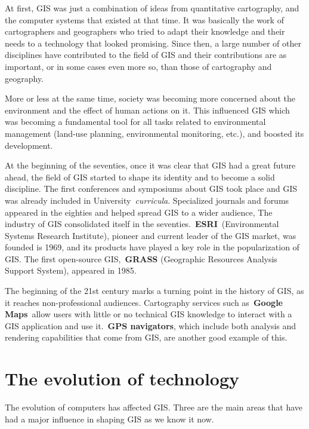 At first, GIS was just a combination of ideas from quantitative cartography, and the computer systems that existed at that time. It was basically the work of cartographers and geographers who tried to adapt their knowledge and their needs to a technology that looked promising. Since then, a large number of other disciplines have contributed to the field of GIS and their contributions are as important, or in some cases even more so, than those of cartography and geography.

More or less at the same time, society was becoming more concerned about the environment and the effect of human actions on it. This influenced GIS which was becoming a fundamental tool for all tasks related to environmental management (land-use planning, environmental monitoring, etc.), and boosted its development.

At the beginning of the seventies, once it was clear that GIS had a great future ahead, the field of GIS started to shape its identity and to become a solid discipline. The first conferences and symposiums about GIS took place and GIS was already included in University \emph{curricula}. Specialized journals and forums appeared in the eighties and helped spread GIS to a wider audience, 
The industry of GIS consolidated itself in the seventies. \textbf{ESRI} (Environmental Systems Research Institute), pioneer and current leader of the GIS market, was founded is 1969, and its products have played a key role in the popularization of GIS. The first open-source GIS, \textbf{GRASS} (Geographic Resources Analysis Support System), appeared in 1985.

The beginning of the 21st century marks a turning point in the history of GIS, as it reaches non-professional audiences. Cartography services such as \textbf{Google Maps} allow users with little or no technical GIS knowledge to interact with a GIS application and use it. \textbf{GPS navigators}, which include both analysis and rendering capabilities that come from GIS, are another good example of this.

\section{The evolution of technology}

The evolution of computers has affected GIS. Three are the main areas that have had a major influence in shaping GIS as we know it now.

